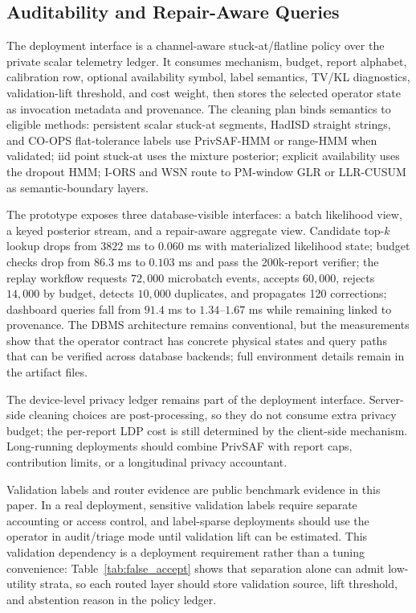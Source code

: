 \documentclass[conference]{IEEEtran}
\begin{document}
\subsection{Auditability and Repair-Aware Queries}
\label{ssec:q5_db}

The deployment interface is a channel-aware stuck-at/flatline policy over the private scalar telemetry ledger. It consumes mechanism, budget, report alphabet, calibration row, optional availability symbol, label semantics, TV/KL diagnostics, validation-lift threshold, and cost weight, then stores the selected operator state as invocation metadata and provenance. The cleaning plan binds semantics to eligible methods: persistent scalar stuck-at segments, HadISD straight strings, and CO-OPS flat-tolerance labels use PrivSAF-HMM or range-HMM when validated; iid point stuck-at uses the mixture posterior; explicit availability uses the dropout HMM; I-ORS and WSN route to PM-window GLR or LLR-CUSUM as semantic-boundary layers.

The prototype exposes three database-visible interfaces: a batch likelihood view, a keyed posterior stream, and a repair-aware aggregate view. Candidate top-\(k\) lookup drops from \(3822\) ms to \(0.060\) ms with materialized likelihood state; budget checks drop from \(86.3\) ms to \(0.103\) ms and pass the 200k-report verifier; the replay workflow requests \(72{,}000\) microbatch events, accepts \(60{,}000\), rejects \(14{,}000\) by budget, detects \(10{,}000\) duplicates, and propagates 120 corrections; dashboard queries fall from \(91.4\) ms to \(1.34\)--\(1.67\) ms while remaining linked to provenance. The DBMS architecture remains conventional, but the measurements show that the operator contract has concrete physical states and query paths that can be verified across database backends; full environment details remain in the artifact files.

The device-level privacy ledger remains part of the deployment interface. Server-side cleaning choices are post-processing, so they do not consume extra privacy budget; the per-report LDP cost is still determined by the client-side mechanism. Long-running deployments should combine PrivSAF with report caps, contribution limits, or a longitudinal privacy accountant.

Validation labels and router evidence are public benchmark evidence in this paper. In a real deployment, sensitive validation labels require separate accounting or access control, and label-sparse deployments should use the operator in audit/triage mode until validation lift can be estimated. This validation dependency is a deployment requirement rather than a tuning convenience: Table~\ref{tab:false_accept} shows that separation alone can admit low-utility strata, so each routed layer should store validation source, lift threshold, and abstention reason in the policy ledger.
\end{document}
